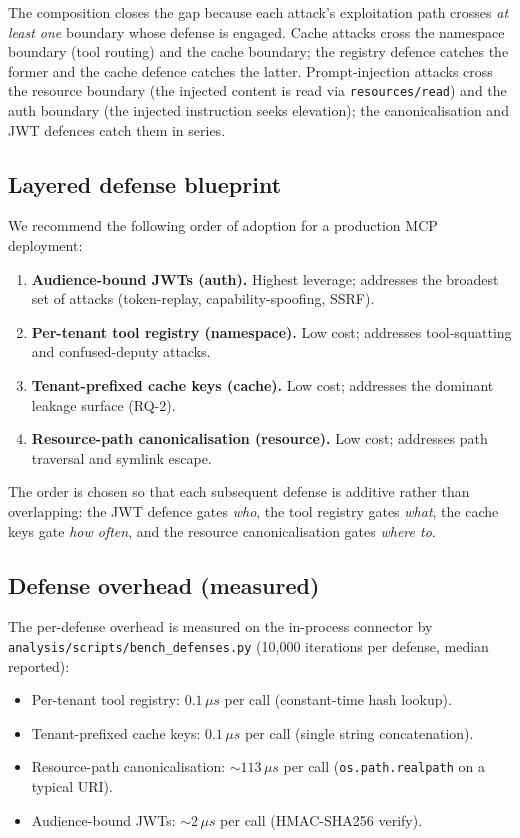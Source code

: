 The composition closes the gap because each attack's
exploitation path crosses \emph{at least one} boundary whose
defense is engaged. Cache attacks cross the namespace boundary
(tool routing) and the cache boundary; the registry defence
catches the former and the cache defence catches the latter.
Prompt-injection attacks cross the resource boundary (the
injected content is read via \texttt{resources/read}) and the
auth boundary (the injected instruction seeks elevation); the
canonicalisation and JWT defences catch them in series.

\subsection{Layered defense blueprint}\label{sec:blueprint}

We recommend the following order of adoption for a production
MCP deployment:

\begin{enumerate}
  \item \textbf{Audience-bound JWTs (auth).} Highest leverage;
        addresses the broadest set of attacks
        (token-replay, capability-spoofing, SSRF).
  \item \textbf{Per-tenant tool registry (namespace).} Low
        cost; addresses tool-squatting and confused-deputy
        attacks.
  \item \textbf{Tenant-prefixed cache keys (cache).} Low cost;
        addresses the dominant leakage surface (RQ-2).
  \item \textbf{Resource-path canonicalisation (resource).} Low
        cost; addresses path traversal and symlink escape.
\end{enumerate}

The order is chosen so that each subsequent defense is
additive rather than overlapping: the JWT defence gates
\emph{who}, the tool registry gates \emph{what}, the cache
keys gate \emph{how often}, and the resource canonicalisation
gates \emph{where to}.

\subsection{Defense overhead (measured)}

The per-defense overhead is measured on the in-process
connector by \texttt{analysis/scripts/bench\_defenses.py}
(10{,}000 iterations per defense, median reported):

\begin{itemize}
  \item Per-tenant tool registry: $0.1\,\mu s$ per call
        (constant-time hash lookup).
  \item Tenant-prefixed cache keys: $0.1\,\mu s$ per call
        (single string concatenation).
  \item Resource-path canonicalisation: $\sim 113\,\mu s$ per
        call (\texttt{os.path.realpath} on a typical URI).
  \item Audience-bound JWTs: $\sim 2\,\mu s$ per call
        (HMAC-SHA256 verify).
\end{itemize}


